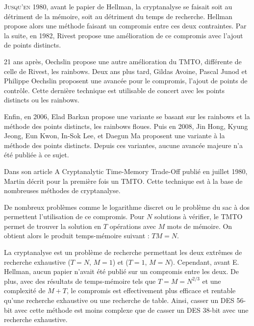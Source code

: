 

		\lettrine{J}{usqu'en 1980}, avant le papier de Hellman\cite{ehellman}, la cryptanalyse se faisait soit au détriment de la mémoire, soit au détriment du temps de recherche. Hellman propose alors une méthode faisant un compromis entre ces deux contraintes. Par la suite, en 1982, Rivest\cite{Rivest} propose une amélioration de ce compromis avec l'ajout de points distincts.

		\bigskip

		21 ans après, Oechslin\cite{Oech03} propose une autre amélioration du \gls{TMTO}, différente de celle de Rivest, les \glspl{rainbow}. Deux ans plus tard, Gildas Avoine, Pascal Junod et Philippe Oechslin\cite{checkpoints} proposent une avancée pour le compromis, l'ajout de points de contrôle. Cette dernière technique est utilisable de concert avec les points distincts ou les \glspl{rainbow}.

		\bigskip

		Enfin, en 2006, Elad Barkan propose une variante se basant sur les \glspl{rainbow} et la méthode des points distincts\cite{fuzzy}, les \glspl{rainbow} floues. Puis en 2008, Jin Hong, Kyung Jeong, Eun Kwon, In-Sok Lee, et Daegun Ma proposent une variante à la méthode des points distincts. Depuis ces variantes, aucune avancée majeure n'a été publiée à ce sujet.


		Dans son article \og{}A Cryptanalytic Time-Memory Trade-Off\fg{}\cite{ehellman} publié en juillet 1980, Martin  décrit pour la première fois un \gls{TMTO}. Cette technique est à la base de nombreuses méthodes de cryptanalyse.

		\bigskip

		De nombreux problèmes comme le logarithme discret ou le problème du sac à dos permettent l'utilisation de ce compromis. Pour $N$ solutions à vérifier, le \gls{TMTO} permet de trouver la solution en $T$ opérations avec $M$ mots de mémoire. On obtient alors le produit temps-mémoire suivant : $TM = N$.

		\bigskip

		La cryptanalyse est un problème de recherche permettant les deux extrêmes de recherche exhaustive ($T=N$, $M=1$) et ($T=1$, $M=N$). Cependant, avant E. Hellman\cite{ehellman}, aucun papier n'avait été publié sur un compromis entre les deux. De plus, avec des résultats de temps-mémoire tels que $T = M = N^{2/3}$ et une complexité de $M + T$, le compromis est effectivement plus efficace et rentable qu'une recherche exhaustive ou une recherche de table. Ainsi, casser un DES 56-bit avec cette méthode est moins complexe que de casser un DES 38-bit avec une recherche exhaustive.

